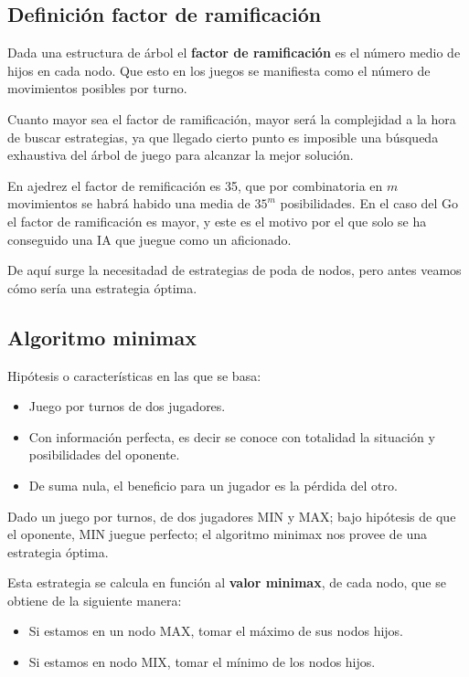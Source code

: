 \documentclass[12 pt, a4paper]{article}
\begin{document}
\subsection{Definición factor de ramificación}
Dada una estructura de árbol el \textbf{factor de ramificación} es el número medio de hijos en cada nodo. 
Que esto en los juegos se manifiesta como el número de movimientos posibles por turno.  

Cuanto mayor sea el factor de ramificación, mayor será la complejidad a la hora de buscar estrategias, ya que 
llegado cierto punto es imposible una búsqueda exhaustiva del árbol de juego para alcanzar la mejor solución.

En ajedrez el 
factor de remificación es 35, que por combinatoria en $m$ movimientos se habrá habido una media de $35^m$ posibilidades.  
En el caso del Go el factor de ramificación es mayor, y este es el motivo por el que solo se ha conseguido una IA que juegue como un aficionado.

De aquí surge la necesitadad de estrategias de poda de nodos, pero antes veamos cómo sería una estrategia óptima. 

\subsection{Algoritmo minimax}

Hipótesis o características en las que se basa: 

\begin{itemize}
  \item Juego por turnos de dos jugadores. 
  \item Con información perfecta, es decir se conoce con totalidad la situación y posibilidades del oponente. 
  \item De suma nula, el beneficio para un jugador es la pérdida del otro. 
\end{itemize}
Dado un juego por turnos, de dos jugadores MIN y MAX; bajo hipótesis de que el oponente, MIN juegue perfecto; 
el algoritmo minimax nos provee de una estrategia óptima. 

Esta estrategia se calcula en  función al \textbf{valor minimax}, de cada nodo, que se obtiene de la siguiente manera: 

\begin{itemize}
  \item Si estamos en un nodo MAX, tomar el máximo de sus nodos hijos.
  \item Si estamos en nodo MIX, tomar el mínimo de los nodos hijos. 
\end{itemize}
\end{document}
